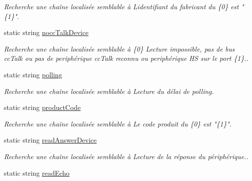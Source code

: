 \begin{DoxyCompactItemize}
\begin{DoxyCompactList}\small\item\em Recherche une chaîne localisée semblable à L\textquotesingle{}identifiant du fabricant du \{0\} est "\{1\}". \end{DoxyCompactList}\item 
static string \mbox{\hyperlink{class_device_library_1_1messages_text_af19cd4177e26f024d4d1a709f51c63b9}{nocc\+Talk\+Device}}
\begin{DoxyCompactList}\small\item\em Recherche une chaîne localisée semblable à \{0\} Lecture impossible, pas de bus cc\+Talk ou pas de periphérique cc\+Talk reconnu ou periphérique HS sur le port \{1\}.. \end{DoxyCompactList}\item 
static string \mbox{\hyperlink{class_device_library_1_1messages_text_ac150c27572b319dde35b8ac2b76e5801}{polling}}
\begin{DoxyCompactList}\small\item\em Recherche une chaîne localisée semblable à Lecture du délai de polling. \end{DoxyCompactList}\item 
static string \mbox{\hyperlink{class_device_library_1_1messages_text_af981c9675348c68009065abaf1a00b28}{product\+Code}}
\begin{DoxyCompactList}\small\item\em Recherche une chaîne localisée semblable à Le code produit du \{0\} est "\{1\}". \end{DoxyCompactList}\item 
static string \mbox{\hyperlink{class_device_library_1_1messages_text_a639a4669a24e5f9579bdd3815268d806}{read\+Answer\+Device}}
\begin{DoxyCompactList}\small\item\em Recherche une chaîne localisée semblable à Lecture de la réponse du périphérique.. \end{DoxyCompactList}\item 
static string \mbox{\hyperlink{class_device_library_1_1messages_text_aac828c24757eef357df7ede8980d5f5d}{read\+Echo}}

\end{DoxyCompactItemize}
